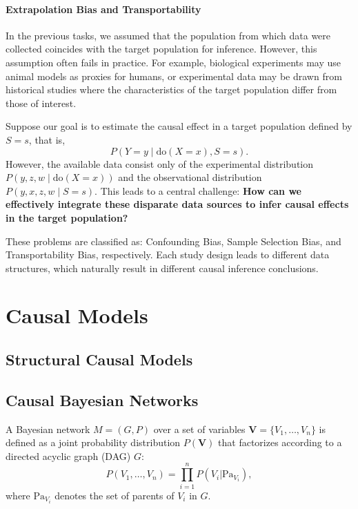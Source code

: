 \paragraph{Extrapolation Bias and Transportability}

In the previous tasks, we assumed that the population from which data were collected coincides with the target population for inference. However, this assumption often fails in practice. For example, biological experiments may use animal models as proxies for humans, or experimental data may be drawn from historical studies where the characteristics of the target population differ from those of interest.

Suppose our goal is to estimate the causal effect in a target population defined by \(S = s\), that is,
\begin{equation*}
	P(Y = y \mid \text{do}(X = x), S = s).
\end{equation*}
However, the available data consist only of the experimental distribution \(P(y, z, w \mid \text{do}(X = x))\) and the observational distribution \(P(y, x, z, w \mid S = s)\). This leads to a central challenge:
\textbf{How can we effectively integrate these disparate data sources to infer causal effects in the target population?}

These problems are classified as: Confounding Bias, Sample Selection Bias, and Transportability Bias, respectively. Each study design leads to different data structures, which naturally result in different causal inference conclusions.

\section{Causal Models}

\subsection{Structural Causal Models}

\subsection{Causal Bayesian Networks}

\begin{definition}
	A Bayesian network \(M = (G, P)\) over a set of variables \(\mathbf{V} = \{V_1, \dots, V_n\}\) is defined as a joint probability distribution \(P(\mathbf{V})\) that factorizes according to a directed acyclic graph (DAG) \(G\):
	\begin{equation}
		P(V_1,\dots,V_n)=\prod_{i=1}^{n} P(V_i|\text{Pa}_{V_i}),
	\end{equation}
	where \(\text{Pa}_{V_i}\) denotes the set of parents of \(V_i\) in \(G\).
\end{definition}

